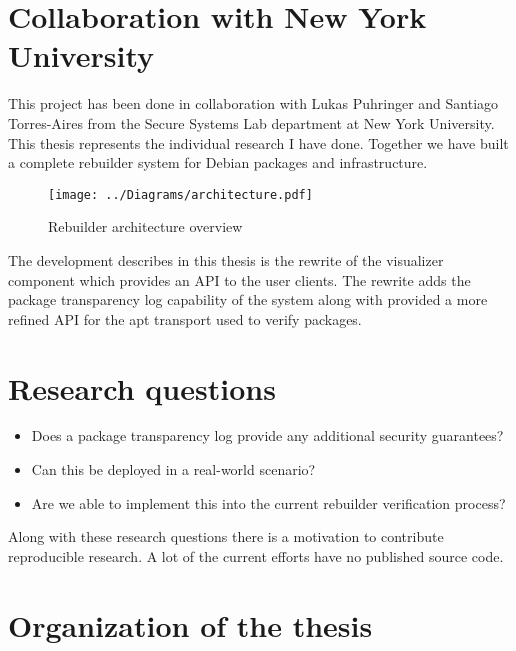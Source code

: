 \documentclass[../Main/thesis.tex]{subfiles}
\begin{document}
\section{Collaboration with New York University}\label{sec:collab}
This project has been done in collaboration with Lukas Puhringer and Santiago
Torres-Aires from the Secure Systems Lab department at New York University. This
thesis represents the individual research I have done. Together we have built a
complete rebuilder system for Debian packages and infrastructure. 

\begin{figure}[H]
\centering
\texttt{[image: ../Diagrams/architecture.pdf]}
\caption{Rebuilder architecture overview}
\label{fig:rebuilder_architecture}
\end{figure}

The development describes in this thesis is the rewrite of the visualizer
component which provides an API to the user clients. The rewrite adds the
package transparency log capability of the system along with provided a more
refined API for the apt transport used to verify packages.

\section{Research questions}\label{sec:rq}
\begin{itemize}
    \item Does a package transparency log provide any additional security guarantees?
    \item Can this be deployed in a real-world scenario?
    \item Are we able to implement this into the current rebuilder verification
        process?
\end{itemize}

Along with these research questions there is a motivation to contribute
reproducible research. A lot of the current efforts have no published source
code.

\section{Organization of the thesis}\label{sec:organization}

\blankpage
\end{document}
